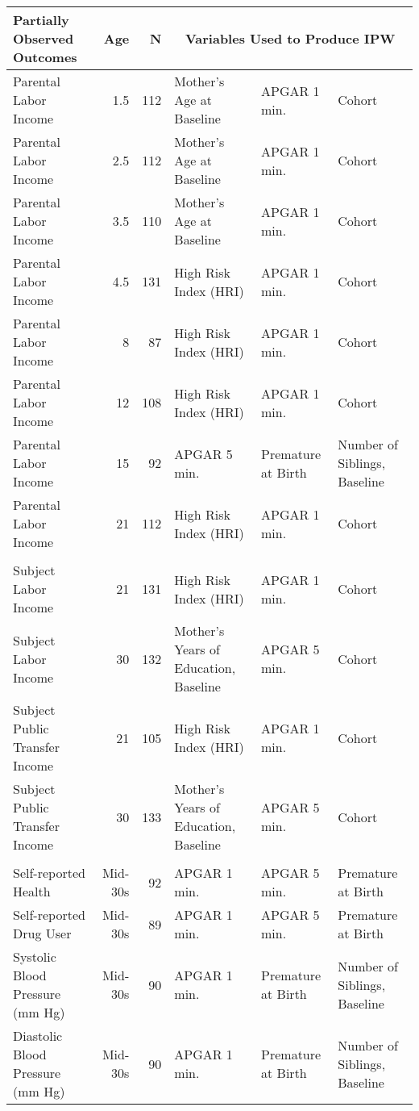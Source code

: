 \footnotesize
\begin{tabular}{l r r l l l}
\toprule											
Partially Observed Outcomes	&	Age	&	N	&	\multicolumn{3}{c}{Variables Used to Produce IPW}	\\
\midrule											
Parental Labor Income	&	1.5	&	112	& Mother's Age at Baseline	& APGAR 1 min.	&  Cohort \\
 Parental Labor Income	&	2.5	&	112	&	Mother's Age at Baseline	& APGAR 1 min.	&  Cohort \\
 Parental Labor Income	&	3.5	&	110	&	Mother's Age at Baseline	& APGAR 1 min.	&  Cohort \\
Parental Labor Income	&	4.5	&	131	&	High Risk Index (HRI)	& APGAR 1 min.	&  Cohort \\
 Parental Labor Income	&	8	&	87	&	High Risk Index (HRI)	& APGAR 1 min.	&  Cohort \\
 Parental Labor Income	&	12	&	108	&	High Risk Index (HRI)	& APGAR 1 min.	&  Cohort \\
 Parental Labor Income	&	15	&	92	&	APGAR 5 min. & 	Premature at Birth & Number of Siblings, Baseline \\
 Parental Labor Income	&	21	&	112	&	High Risk Index (HRI)	& APGAR 1 min.	&  Cohort \\
\\
Subject Labor Income	&	21	&	131	& High Risk Index (HRI) & APGAR 1 min. & Cohort \\
 Subject Labor Income	&	30	&	132	& Mother's Years of Education, Baseline & APGAR 5 min. & Cohort	\\
 Subject Public Transfer Income	&	21	&	105	& High Risk Index (HRI) & APGAR 1 min. & Cohort \\
 Subject Public Transfer Income	&	30	&	133	& Mother's Years of Education, Baseline & APGAR 5 min. & Cohort	\\
 \\
 Self-reported Health	&	Mid-30s	&	92	&	APGAR 1 min. & APGAR 5 min. & Premature at Birth	\\
 Self-reported Drug User	&	Mid-30s	&	89	&	APGAR 1 min. & APGAR 5 min. & Premature at Birth	\\
 Systolic Blood Pressure (mm Hg)	&	Mid-30s	&	90	&	APGAR 1 min. & Premature at Birth & Number of Siblings, Baseline	\\
 Diastolic Blood Pressure (mm Hg)	&	Mid-30s	 &	90	&	APGAR 1 min. & Premature at Birth & Number of Siblings, Baseline	\\
 

\end{tabular}
